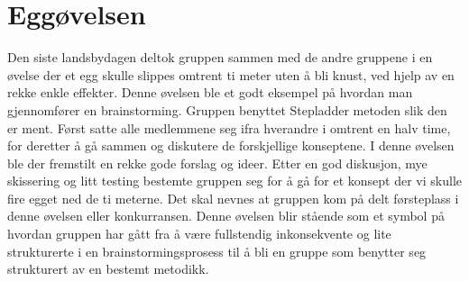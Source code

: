 \section{Eggøvelsen}
Den siste landsbydagen deltok gruppen sammen med de andre gruppene i en øvelse der et egg skulle slippes omtrent ti meter uten å bli knust, ved hjelp av en rekke enkle effekter. Denne øvelsen ble et godt eksempel på hvordan man gjennomfører en brainstorming. 
Gruppen benyttet Stepladder metoden slik den er ment. Først satte alle medlemmene seg ifra hverandre i omtrent en halv time, for deretter å gå sammen og diskutere de forskjellige konseptene. I denne øvelsen ble der fremstilt en rekke gode forslag og ideer. Etter en god diskusjon, mye skissering og litt testing bestemte gruppen seg for å gå for et konsept der vi skulle fire egget ned de ti meterne. Det skal nevnes at gruppen kom på delt førsteplass i denne øvelsen eller konkurransen. 
Denne øvelsen blir stående som et symbol på hvordan gruppen har gått fra å være fullstendig inkonsekvente og lite strukturerte i en brainstormingsprosess til å bli en gruppe som benytter seg strukturert av en bestemt metodikk. 


